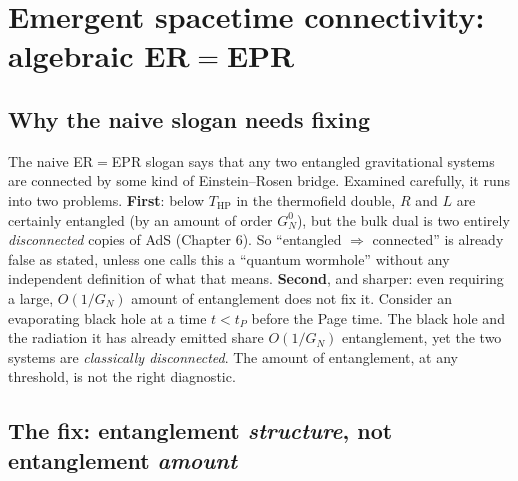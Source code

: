 \section{Emergent spacetime connectivity: algebraic ER\texorpdfstring{$=$}{=}EPR}

\subsection*{Why the naive slogan needs fixing}

The naive ER$=$EPR slogan says that any two entangled gravitational systems are connected by some kind of
Einstein--Rosen bridge. Examined carefully, it runs into two problems. \textbf{First}: below $T_{\text{HP}}$ in
the thermofield double, $R$ and $L$ are certainly entangled (by an amount of order $G_N^0$), but the bulk dual
is two entirely \emph{disconnected} copies of AdS (Chapter 6). So ``entangled $\Rightarrow$ connected'' is
already false as stated, unless one calls this a ``quantum wormhole'' without any independent definition of
what that means. \textbf{Second}, and sharper: even requiring a large, $O(1/G_N)$ amount of entanglement does
not fix it. Consider an evaporating black hole at a time $t<t_P$ before the Page time. The black hole and the
radiation it has already emitted share $O(1/G_N)$ entanglement, yet the two systems are \emph{classically
disconnected}. The amount of entanglement, at any threshold, is not the right diagnostic.

\subsection*{The fix: entanglement \emph{structure}, not entanglement \emph{amount}}

